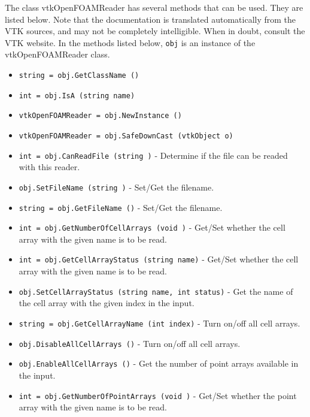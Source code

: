 The class vtkOpenFOAMReader has several methods that can be used.
  They are listed below.
Note that the documentation is translated automatically from the VTK sources,
and may not be completely intelligible.  When in doubt, consult the VTK website.
In the methods listed below, \verb|obj| is an instance of the vtkOpenFOAMReader class.
\begin{itemize}
\item  \verb|string = obj.GetClassName ()|

\item  \verb|int = obj.IsA (string name)|

\item  \verb|vtkOpenFOAMReader = obj.NewInstance ()|

\item  \verb|vtkOpenFOAMReader = obj.SafeDownCast (vtkObject o)|

\item  \verb|int = obj.CanReadFile (string )| -  Determine if the file can be readed with this reader.

\item  \verb|obj.SetFileName (string )| -  Set/Get the filename.

\item  \verb|string = obj.GetFileName ()| -  Set/Get the filename.

\item  \verb|int = obj.GetNumberOfCellArrays (void )| -  Get/Set whether the cell array with the given name is to
 be read.

\item  \verb|int = obj.GetCellArrayStatus (string name)| -  Get/Set whether the cell array with the given name is to
 be read.

\item  \verb|obj.SetCellArrayStatus (string name, int status)| -  Get the name of the  cell array with the given index in
 the input.

\item  \verb|string = obj.GetCellArrayName (int index)| -  Turn on/off all cell arrays.

\item  \verb|obj.DisableAllCellArrays ()| -  Turn on/off all cell arrays.

\item  \verb|obj.EnableAllCellArrays ()| -  Get the number of point arrays available in the input.

\item  \verb|int = obj.GetNumberOfPointArrays (void )| -  Get/Set whether the point array with the given name is to
 be read.


\end{itemize}
